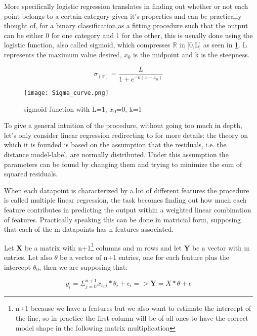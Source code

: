 More specifically logistic regression translates in finding out whether or not each point belongs to a certain category given it's properties and can be practically thought of, for a binary classification,as a fitting procedure such that the output can be either 0 for one category and 1 for the other, this is usually done using the logistic function, also called sigmoid, which compresses $\mathbb {R}$ in [0,L] as seen in  \ref{sigmoid}. L represents the maximum value desired, $x_0$ is the midpoint and k is the steepness.

\begin{equation}
\sigma_{(x)} = \frac{L}{1+e^{-k(x-x_0)}}
\end{equation}

\begin{figure}[H]
		\centering
  		\texttt{[image: Sigma\_curve.png]}
        \caption{sigmoid function with L=1, $x_0$=0, k=1 \label{sigmoid}}
\end{figure}

To give a general intuition of the procedure, without going too much in depth, let's only consider linear regression redirecting to \cite{StatisticalLearning} for more details; the theory on which it is founded is based on the assumption that the residuals, i.e. the distance model-label, are normally distributed. Under this assumption the parameters can be found by changing them and trying to minimize the sum of squared residuals.

When each datapoint is characterized by a lot of different features the procedure is called multiple linear regression, the task becomes finding out how much each feature contributes in predicting the output within a weighted linear combination of features. Practically speaking this can be done in matricial form, supposing that each of the m datapoints has n features associated.

Let  \textbf{X} be a matrix with n+1\footnote{n+1 because we have n features but we also want to estimate the intercept of the line, so in practice the first column will be of all ones to have the correct model shape in the following matrix multiplication} columns and m rows and let  \textbf{Y} be a vector with m entries. Let also \textbf{$\theta$} be a vector of n+1 entries, one for each feature plus the intercept $\theta_0$, then we are supposing that:

\begin{equation}
y_i = \Sigma^{n+1}_{j=0} x_{i,j}*\theta_i + \epsilon_i =>  \textbf{Y} =  \textbf{$X*\theta$} + \textbf{$\epsilon$}
\end{equation}

